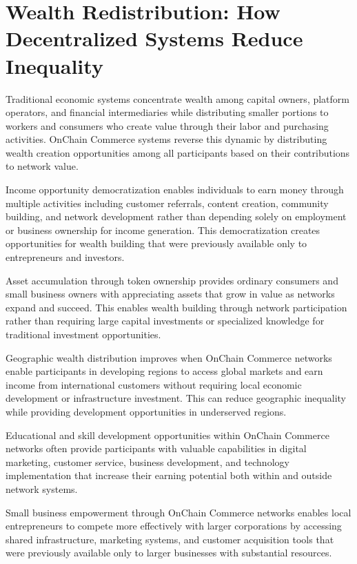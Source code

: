 \documentclass[
  Letterpaper,
]{scrbook}
\begin{document}
\section{Wealth Redistribution: How Decentralized Systems Reduce
Inequality}\label{wealth-redistribution-how-decentralized-systems-reduce-inequality}

Traditional economic systems concentrate wealth among capital owners,
platform operators, and financial intermediaries while distributing
smaller portions to workers and consumers who create value through their
labor and purchasing activities. OnChain Commerce systems reverse this
dynamic by distributing wealth creation opportunities among all
participants based on their contributions to network value.

Income opportunity democratization enables individuals to earn money
through multiple activities including customer referrals, content
creation, community building, and network development rather than
depending solely on employment or business ownership for income
generation. This democratization creates opportunities for wealth
building that were previously available only to entrepreneurs and
investors.

Asset accumulation through token ownership provides ordinary consumers
and small business owners with appreciating assets that grow in value as
networks expand and succeed. This enables wealth building through
network participation rather than requiring large capital investments or
specialized knowledge for traditional investment opportunities.

Geographic wealth distribution improves when OnChain Commerce networks
enable participants in developing regions to access global markets and
earn income from international customers without requiring local
economic development or infrastructure investment. This can reduce
geographic inequality while providing development opportunities in
underserved regions.

Educational and skill development opportunities within OnChain Commerce
networks often provide participants with valuable capabilities in
digital marketing, customer service, business development, and
technology implementation that increase their earning potential both
within and outside network systems.

Small business empowerment through OnChain Commerce networks enables
local entrepreneurs to compete more effectively with larger corporations
by accessing shared infrastructure, marketing systems, and customer
acquisition tools that were previously available only to larger
businesses with substantial resources.
\end{document}

